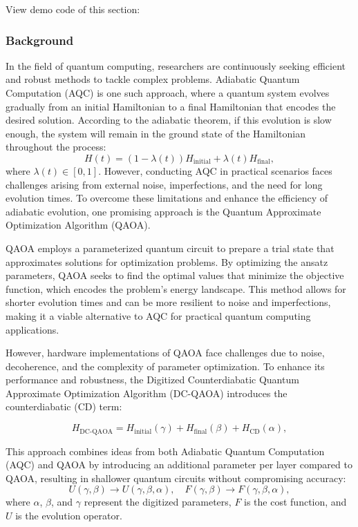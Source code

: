 

View demo code of this section: 

\subsubsection{Background}
In the field of quantum computing, researchers are continuously seeking efficient and robust methods to tackle complex problems. Adiabatic Quantum Computation (AQC) is one such approach, where a quantum system evolves gradually from an initial Hamiltonian to a final Hamiltonian that encodes the desired solution. According to the adiabatic theorem, if this evolution is slow enough, the system will remain in the ground state of the Hamiltonian throughout the process:
\begin{equation}
    H(t) = (1-\lambda(t))H_{\text{initial}} + \lambda(t)H_{\text{final}},
\end{equation}
where \(\lambda(t) \in [0, 1]\). However, conducting AQC in practical scenarios faces challenges arising from external noise, imperfections, and the need for long evolution times. To overcome these limitations and enhance the efficiency of adiabatic evolution, one promising approach is the Quantum Approximate Optimization Algorithm (QAOA).

QAOA employs a parameterized quantum circuit to prepare a trial state that approximates solutions for optimization problems. By optimizing the ansatz parameters, QAOA seeks to find the optimal values that minimize the objective function, which encodes the problem's energy landscape. This method allows for shorter evolution times and can be more resilient to noise and imperfections, making it a viable alternative to AQC for practical quantum computing applications.

However, hardware implementations of QAOA face challenges due to noise, decoherence, and the complexity of parameter optimization. To enhance its performance and robustness, the Digitized Counterdiabatic Quantum Approximate Optimization Algorithm (DC-QAOA) introduces the counterdiabatic (CD) term:

\begin{equation}
    H_{\text{DC-QAOA}} = H_{\text{initial}}(\gamma) + H_{\text{final}}(\beta) + H_{\text{CD}}(\alpha),
\end{equation}

This approach combines ideas from both Adiabatic Quantum Computation (AQC) and QAOA by introducing an additional parameter per layer compared to QAOA, resulting in shallower quantum circuits without compromising accuracy:
\begin{equation}
    \label{eq:evo operator}
    U(\gamma, \beta) \to U(\gamma, \beta, \alpha), \quad F(\gamma, \beta) \to F(\gamma, \beta, \alpha),
\end{equation}
where \(\alpha\), \(\beta\), and \(\gamma\) represent the digitized parameters, \(F\) is the cost function, and \(U\) is the evolution operator.


